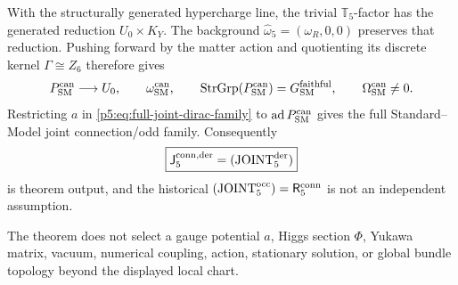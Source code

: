 \documentclass[11pt,a4paper]{article}
\begin{document}
\begin{theorem}
With the structurally generated hypercharge line, the trivial \(\mathbb T_5\)-factor has the generated
reduction \(U_0\times K_Y\).  The background
\(\widehat\omega_5=(\omega_R,0,0)\) preserves that reduction.  Pushing forward
by the matter action and quotienting its discrete kernel \(\Gamma\cong Z_6\)
therefore gives
\begin{equation}
\label{p5:eq:faithful-sm-principal-connection}
 P_{\rm SM}^{\rm can}\longrightarrow U_0,
 \qquad
 \omega_{\rm SM}^{\rm can},
 \qquad
 \operatorname{StrGrp}(P_{\rm SM}^{\rm can})
 =G_{\rm SM}^{\rm faithful},
 \qquad
 \Omega_{\rm SM}^{\rm can}\ne0 .
\end{equation}
Restricting \(a\) in \eqref{p5:eq:full-joint-dirac-family} to
\(\operatorname{ad}P_{\rm SM}^{\rm can}\) gives the full Standard--Model
joint connection/odd family.  Consequently
\[
\boxed{
\mathsf J_5^{\rm conn,der}
=({\rm JOINT}_5^{\rm der})
}
\]
is theorem output, and the historical
\(({\rm JOINT}_5^{\rm occ})=\mathsf R_5^{\rm conn}\) is not an independent
assumption.

The theorem does not select a gauge potential \(a\), Higgs section \(\Phi\),
Yukawa matrix, vacuum, numerical coupling, action, stationary solution, or
global bundle topology beyond the displayed local chart.
\end{theorem}
\end{document}
